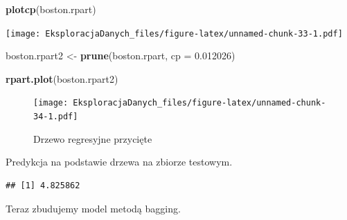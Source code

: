 \documentclass[]{book}
\newenvironment{Shaded}{\begin{snugshade}}{\end{snugshade}}
\newcommand{\ControlFlowTok}[1]{\textcolor[rgb]{0.13,0.29,0.53}{\textbf{#1}}}
\newcommand{\DataTypeTok}[1]{\textcolor[rgb]{0.13,0.29,0.53}{#1}}
\newcommand{\DecValTok}[1]{\textcolor[rgb]{0.00,0.00,0.81}{#1}}
\newcommand{\FloatTok}[1]{\textcolor[rgb]{0.00,0.00,0.81}{#1}}
\newcommand{\KeywordTok}[1]{\textcolor[rgb]{0.13,0.29,0.53}{\textbf{#1}}}
\newcommand{\NormalTok}[1]{#1}
\newcommand{\OperatorTok}[1]{\textcolor[rgb]{0.81,0.36,0.00}{\textbf{#1}}}
\newcommand{\StringTok}[1]{\textcolor[rgb]{0.31,0.60,0.02}{#1}}
\theoremstyle{plain}
\theoremstyle{definition}
\begin{document}
\begin{Shaded}
\begin{Highlighting}[]
\KeywordTok{plotcp}\NormalTok{(boston.rpart)}
\end{Highlighting}
\end{Shaded}

\texttt{[image: EksploracjaDanych\_files/figure-latex/unnamed-chunk-33-1.pdf]}

\begin{Shaded}
\begin{Highlighting}[]
\NormalTok{boston.rpart2 <-}\StringTok{ }\KeywordTok{prune}\NormalTok{(boston.rpart, }\DataTypeTok{cp =} \FloatTok{0.012026}\NormalTok{)}
\end{Highlighting}
\end{Shaded}

\begin{Shaded}
\begin{Highlighting}[]
\KeywordTok{rpart.plot}\NormalTok{(boston.rpart2)}
\end{Highlighting}
\end{Shaded}

\begin{figure}
\centering
\texttt{[image: EksploracjaDanych\_files/figure-latex/unnamed-chunk-34-1.pdf]}
\caption{\label{fig:unnamed-chunk-34}Drzewo regresyjne przycięte}
\end{figure}

Predykcja na podstawie drzewa na zbiorze testowym.

\begin{Shaded}
\end{Shaded}

\begin{verbatim}
## [1] 4.825862
\end{verbatim}

Teraz zbudujemy model metodą bagging.
\end{document}
